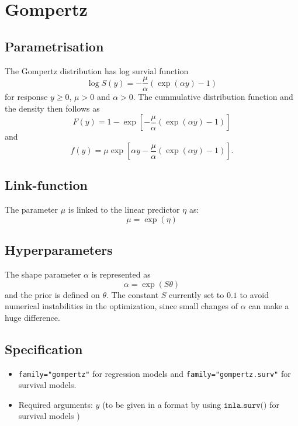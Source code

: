 \documentclass[a4paper,11pt]{article}
\begin{document}
\section*{Gompertz}

\subsection*{Parametrisation}

The Gompertz distribution has log survial function
\begin{displaymath}
    \log S(y) = -\frac{\mu}{\alpha}\left(\exp(\alpha y) -1\right)
\end{displaymath}
for response $y\ge 0$, $\mu>0$ and $\alpha>0$. The cummulative
distribution function and the density then follows as
\begin{displaymath}
    F(y) = 1 - \exp\left[ -\frac{\mu}{\alpha}\left(\exp(\alpha y)
        -1\right) \right]
\end{displaymath}
and
\begin{displaymath}
    f(y) = \mu \exp\left[ \alpha y -\frac{\mu}{\alpha}\left(\exp(\alpha y)
        -1\right) \right].
\end{displaymath}

\subsection*{Link-function}
The parameter $\mu$ is linked to the linear predictor $\eta$ as:
\[
    \mu = \exp(\eta)
\]

\subsection*{Hyperparameters}

The shape parameter $\alpha$ is represented as
\begin{displaymath}
    \alpha = \exp(S\theta)
\end{displaymath}
and the prior is defined on $\theta$. The constant $S$ currently set
to $0.1$ to avoid numerical instabilities in the optimization, since
small changes of $\alpha$ can make a huge difference.

\subsection*{Specification}

\begin{itemize}
\item \texttt{family="gompertz"} for regression models and
    \texttt{family="gompertz.surv"} for survival models.
\item Required arguments: $y$ (to be given in a format by using
    $\texttt{inla.surv()}$ for survival models )
\end{itemize}
\end{document}
